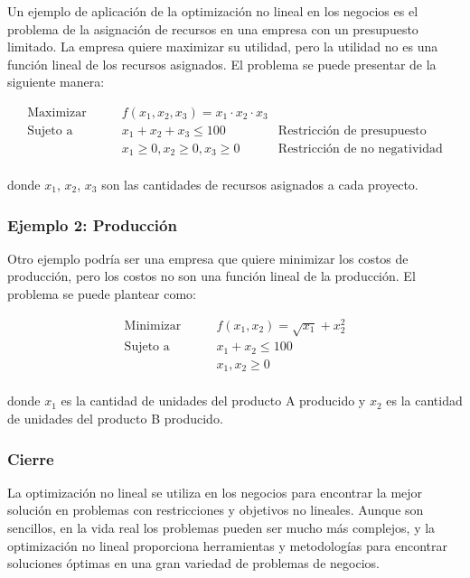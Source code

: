 \documentclass{beamer}
\begin{document}
\begin{frame}
    Un ejemplo de aplicación de la optimización no lineal en los negocios es el problema de la asignación de recursos en una empresa con un presupuesto limitado. La empresa quiere maximizar su utilidad, pero la utilidad no es una función lineal de los recursos asignados. El problema se puede presentar de la siguiente manera:

    \begin{align*}
        \text{Maximizar} \qquad & f(x_1, x_2, x_3) = x_1\cdot x_2 \cdot x_3 \\
        \text{Sujeto a} \qquad & x_1 + x_2 + x_3 \leq 100  & \text{Restricción de presupuesto}\\
        & x_1 \geq 0, x_2 \geq 0, x_3 \geq 0  & \text{Restricción de no negatividad}\\
    \end{align*}

    donde $x_1$, $x_2$, $x_3$ son las cantidades de recursos asignados a cada proyecto. 
\end{frame}
\begin{frame}
    \frametitle{Ejemplo 2: Producción}
    
    Otro ejemplo podría ser una empresa que quiere minimizar los costos de producción, pero los costos no son una función lineal de la producción. El problema se puede plantear como:
    
    \begin{align*}
    \text{Minimizar} \qquad & f(x_1, x_2) = \sqrt{x_1} + x_2^2 \\
    \text{Sujeto a} \qquad & x_1 + x_2 \leq 100 \\
    & x_1, x_2 \geq 0 \\
    \end{align*}
    
    donde $x_1$ es la cantidad de unidades del producto A producido y $x_2$ es la cantidad de unidades del producto B producido.

\end{frame}
\begin{frame}
    \frametitle{Cierre}
    
    La optimización no lineal se utiliza en los negocios para encontrar la mejor solución en problemas con restricciones y objetivos no lineales. Aunque son sencillos, en la vida real los problemas pueden ser mucho más complejos, y la optimización no lineal proporciona herramientas y metodologías para encontrar soluciones óptimas en una gran variedad de problemas de negocios.
    
    \end{frame}
\end{document}
